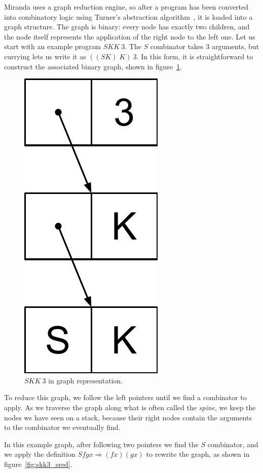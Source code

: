 \documentclass[conference]{IEEEtran}
\begin{document}
Miranda uses a graph reduction engine, so after a program has been converted into combinatory logic using Turner's abstraction algorithm~\cite{turner_another_1979}, it is loaded into a graph structure.
The graph is binary: every node has exactly two children, and the node itself represents the application of the right node to the left one.
Let us start with an example program $SKK \ 3$.
The $S$ combinator takes 3 arguments, but currying lets us write it as $((SK) \; K)\ 3$.
In this form, it is straightforward to construct the associated binary graph, shown in figure~\ref{fig:skk3}.

\begin{figure}
    \includegraphics[width=.23\columnwidth]{skk3}
    \centering
    \caption{$SKK \ 3$ in graph representation.}
    \label{fig:skk3}
\end{figure}

To reduce this graph, we follow the left pointers until we find a combinator to apply.
As we traverse the graph along what is often called the \textit{spine}, we keep the nodes we have seen on a stack, because their right nodes contain the arguments to the combinator we eventually find.

In this example graph, after following two pointers we find the $S$ combinator, and we apply the definition $S f g x \Rightarrow (f x) (g x)$ to rewrite the graph, as shown in figure~\ref{fig:skk3_sred}.
\end{document}
